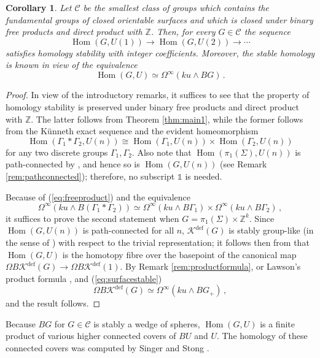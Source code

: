 \documentclass[oneside, a4paper, 12pt]{article}
\numberwithin{equation}{section}
\DeclareMathOperator{\Hom}{Hom}
\newcommand{\Kdef}{\mathcal{K}^{\mathrm{def}}}
\newcommand{\Z}{\mathbb{Z}}
\theoremstyle{plain}
\newtheorem{corollary}[theorem]{Corollary}
\theoremstyle{definition}
\theoremstyle{remark}
\begin{document}
\begin{corollary}
Let $\mathcal{C}$ be the smallest class of groups which contains the fundamental groups of closed orientable surfaces and which is closed under binary free products and direct product with $\Z$. Then, for every $G\in \mathcal{C}$ the sequence
\[
\Hom(G,U(1))\to \Hom(G,U(2)) \to \cdots
\]
satisfies homology stability with integer coefficients. Moreover, the stable homology is known in view of the equivalence
\[
\Hom(G,U)\simeq \Omega^\infty(ku\wedge BG)\, .
\]
\end{corollary}
\begin{proof}
In view of the introductory remarks, it suffices to see that the property of homology stability is preserved under binary free products and direct product with $\Z$. The latter follows from Theorem \ref{thm:main1}, while the former follows from the K{\"u}nneth exact sequence and the evident homeomorphism
\begin{equation} \label{eq:freeproduct}
\Hom(\Gamma_1\ast \Gamma_2,U(n)) \cong \Hom(\Gamma_1,U(n)) \times \Hom(\Gamma_2,U(n))
\end{equation}
for any two discrete groups $\Gamma_1, \Gamma_2$. Also note that $\Hom(\pi_1(\Sigma),U(n))$ is path-connected by \cite[Corollary 4.11]{RYangMills}, and hence so is $\Hom(G,U(n))$ (see Remark \ref{rem:pathconnected}); therefore, no subscript $\mathds{1}$ is needed.

Because of (\ref{eq:freeproduct}) and the equivalence
\[
\Omega^\infty(ku\wedge B(\Gamma_1\ast \Gamma_2)) \simeq \Omega^\infty(ku\wedge B\Gamma_1)\times  \Omega^\infty(ku\wedge B\Gamma_2)\, ,
\]
it suffices to prove the second statement when $G=\pi_1(\Sigma)\times \Z^k$. Since $\Hom(G,U(n))$ is path-connected for all $n$, $\Kdef(G)$ is stably group-like (in the sense of \cite[Section 2.3]{RYangMills}) with respect to the trivial representation; it follows then from \cite[Theorem 2.3]{RYangMills} that $\Hom(G,U)$ is the homotopy fibre over the basepoint of the canonical map $\Omega B \Kdef(G)\to \Omega B \Kdef(1)$. By Remark \ref{rem:productformula}, or Lawson's product formula \cite{Lawson}, and (\ref{eq:surfacestable})
\[
\Omega B \Kdef(G) \simeq \Omega^\infty(ku\wedge BG_+)\,,
\]
and the result follows.
\end{proof}


Because $BG$ for $G\in \mathcal{C}$ is stably a wedge of spheres, $\Hom(G,U)$ is a finite product of various higher connected covers of $BU$ and $U$. The homology of these connected covers was computed by Singer \cite{Singer} and Stong \cite{Stong}. 
\end{document}
